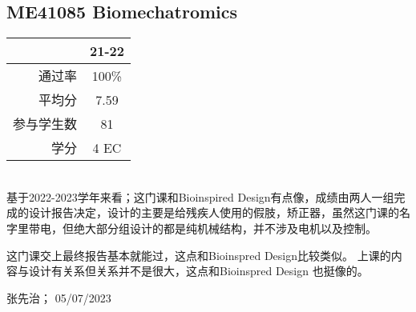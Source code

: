 \subsection{ME41085 Biomechatromics}\hypertarget{ME41085}{} 
\begin{minipage}{0.45\textwidth}
\centering
{}
\end{minipage}%
\begin{minipage}{0.45\textwidth}
\raggedleft
\begin{tabular}{r|c}
\textbf{ } & \textbf{21-22} \\ \hline
通过率 & 100\% \\ 
平均分 & 7.59 \\ 
参与学生数 & 81 \\
学分 & 4 EC\\
\end{tabular}
\end{minipage}\\

基于2022-2023学年来看；这门课和Bioinspired Design有点像，成绩由两人一组完成的设计报告决定，设计的主要是给残疾人使用的假肢，矫正器，虽然这门课的名字里带电，但绝大部分组设计的都是纯机械结构，并不涉及电机以及控制。

这门课交上最终报告基本就能过，这点和Bioinspred Design比较类似。
上课的内容与设计有关系但关系并不是很大，这点和Bioinspred Design 也挺像的。
\begin{flushright}
张先治； 05/07/2023
\end{flushright}
